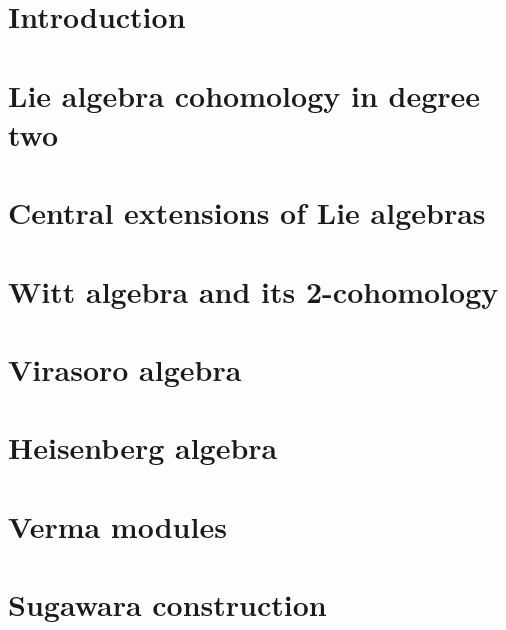 %

\chapter{Introduction}


\chapter{Lie algebra cohomology in degree two}


\chapter{Central extensions of Lie algebras}


\chapter{Witt algebra and its 2-cohomology}


\chapter{Virasoro algebra}


\chapter{Heisenberg algebra}


\chapter{Verma modules}


\chapter{Sugawara construction}

